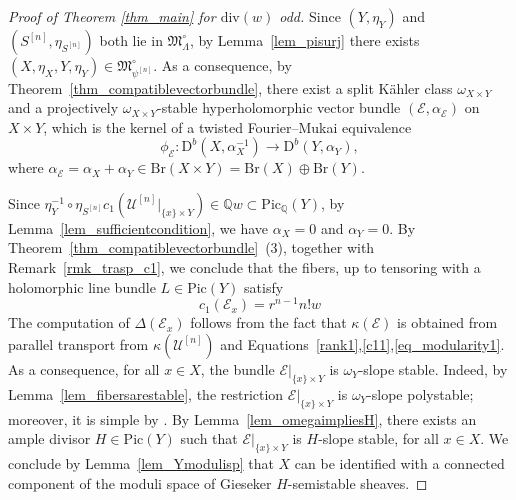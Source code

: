 \documentclass[12pt,a4paper]{amsart}
\theoremstyle{plain}
\theoremstyle{definition}
\theoremstyle{remark}
\def\Pic{\mathrm{Pic}}
\def\QQ{\mathbb{Q}}
\newcommand{\D}{\mathrm{D}^b}
\newcommand{\kE}{\mathcal{E}}
\newcommand{\Br}{\mathrm{Br}}
\newcommand{\dv}{\mathrm{div}}
\newcommand{\Lambdan}{{\Lambda}}
\newcommand{\psin}{{\psi^{[n]}}}
\newcommand{\cc}{c}
\begin{document}
\begin{proof}[Proof of Theorem \ref{thm_main} for $\dv(w)$ odd]
Since $(Y,\eta_Y)$ and $(S^{[n]},\eta_{S^{[n]}})$ both lie in $\mathfrak{M}^\circ_\Lambdan$, by Lemma~\ref{lem_pisurj} there exists $(X,\eta_X,Y,\eta_Y) \in \mathfrak{M}^\circ_{\psin}$. As a consequence, by Theorem~\ref{thm_compatiblevectorbundle}, there exist a split K\"ahler class $\omega_{X\times Y}$ and a projectively $\omega_{X\times Y}$-stable hyperholomorphic vector bundle $(\kE,\alpha_\kE)$ on $X\times Y$, which is the kernel of a twisted Fourier--Mukai equivalence
\[
\phi_{\mathcal{E}}\colon \D(X,\alpha_X^{-1}) \to \D(Y,\alpha_Y),
\]
where $\alpha_\kE = \alpha_X + \alpha_Y \in \Br(X\times Y) = \Br(X) \oplus \Br(Y)$.

Since $\eta_Y^{-1}\circ\eta_{S^{[n]}}\cc_1\left(\mathcal{U}^{[n]}|_{\{x\}\times Y}\right)\in\QQ w\subset\Pic_{\QQ}(Y)$, by Lemma~\ref{lem_sufficientcondition}, we have $\alpha_X=0$ and $\alpha_Y=0$.
By Theorem~\ref{thm_compatiblevectorbundle}~(3), together with Remark~\ref{rmk_trasp_c1}, we conclude that the fibers, up to tensoring with a holomorphic line bundle $L\in\Pic(Y)$ satisfy
\begin{equation*}
    \cc_1(\mathcal{E}_x)= 
           r^{n-1}n! w 
\end{equation*}
The computation of $\Delta(\mathcal{E}_x)$ follows from the fact that $\kappa(\mathcal{E})$ is obtained from parallel transport from $\kappa(\mathcal{U}^{[n]})$ and Equations~\eqref{rank1},\eqref{c11},\eqref{eq_modularity1}. 
As a consequence, for all $x \in X$, the bundle $\kE|_{\{x\}\times Y}$ is $\omega_Y$-slope stable. Indeed, by Lemma~\ref{lem_fibersarestable}, the restriction $\kE|_{\{x\}\times Y}$ is $\omega_Y$-slope polystable; moreover, it is simple by \cite[Theorem~3.2.1]{caldararu-thesis}. By Lemma~\ref{lem_omegaimpliesH}, there exists an ample divisor $H \in \Pic(Y)$ such that $\kE|_{\{x\}\times Y}$ is $H$-slope stable, for all $x\in X$. We conclude by Lemma~\ref{lem_Ymodulisp} that $X$ can be identified with a connected component of the moduli space of Gieseker $H$-semistable sheaves.
\end{proof}
\end{document}

